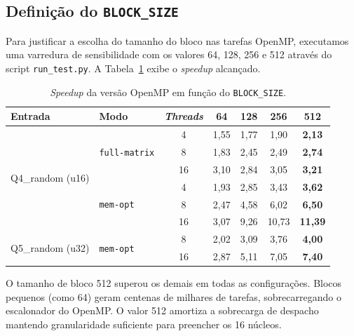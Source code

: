\subsection{Definição do \texttt{BLOCK\_SIZE}}

Para justificar a escolha do tamanho do bloco nas tarefas OpenMP, executamos uma varredura de sensibilidade com os valores 64, 128, 256 e 512 através do script \texttt{run\_test.py}. A Tabela~\ref{tab:blocksize} exibe o \textit{speedup} alcançado.

\begin{table}[H]
\centering
\caption{\textit{Speedup} da versão OpenMP em função do \texttt{BLOCK\_SIZE}.}
\label{tab:blocksize}
\begin{tabular}{@{}llccccc@{}}
\toprule
Entrada & Modo & \textit{Threads} & 64 & 128 & 256 & 512 \\ \midrule
\multirow{6}{*}{Q4\_random (u16)} & \multirow{3}{*}{\texttt{full-matrix}} & 4 & 1{,}55 & 1{,}77 & 1{,}90 & \textbf{2{,}13} \\
 & & 8 & 1{,}83 & 2{,}45 & 2{,}49 & \textbf{2{,}74} \\
 & & 16 & 3{,}10 & 2{,}84 & 3{,}05 & \textbf{3{,}21} \\ \cmidrule(l){2-7}
 & \multirow{3}{*}{\texttt{mem-opt}} & 4 & 1{,}93 & 2{,}85 & 3{,}43 & \textbf{3{,}62} \\
 & & 8 & 2{,}47 & 4{,}58 & 6{,}02 & \textbf{6{,}50} \\
 & & 16 & 3{,}07 & 9{,}26 & 10{,}73 & \textbf{11{,}39} \\ \midrule
\multirow{2}{*}{Q5\_random (u32)} & \multirow{2}{*}{\texttt{mem-opt}} & 8 & 2{,}02 & 3{,}09 & 3{,}76 & \textbf{4{,}00} \\
 & & 16 & 2{,}87 & 5{,}11 & 7{,}05 & \textbf{7{,}40} \\ \bottomrule
\end{tabular}
\end{table}

O tamanho de bloco 512 superou os demais em todas as configurações. Blocos pequenos (como 64) geram centenas de milhares de tarefas, sobrecarregando o escalonador do OpenMP. O valor 512 amortiza a sobrecarga de despacho mantendo granularidade suficiente para preencher os 16 núcleos.
